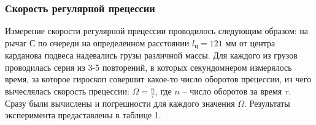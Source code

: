 \documentclass[a4paper, 12pt]{article}%
\begin{document}
\subsubsection{Скорость регулярной прецессии}
Измерение скорости регулярной прецессии проводилось следующим образом: на рычаг С по очереди на определенном расстоянии $l_{\text{ц}}=121$ мм  от центра карданова подвеса надевались грузы различной массы. Для каждого из грузов проводилась серия из 3-5 повторений, в которых секундомнером измерялось время, за которое гироскоп совершит какое-то число оборотов прецессии, из чего вычеслялась скорость прецессии: $\Omega=\frac{n}{\tau}$, где $n$ -- число оборотов за время $\tau$. Сразу были вычислены и погрешности для каждого значения $\Omega$. Результаты эксперимента предаставлены в таблице 1.
\begin{table}[h!]
\end{table}
\end{document}
